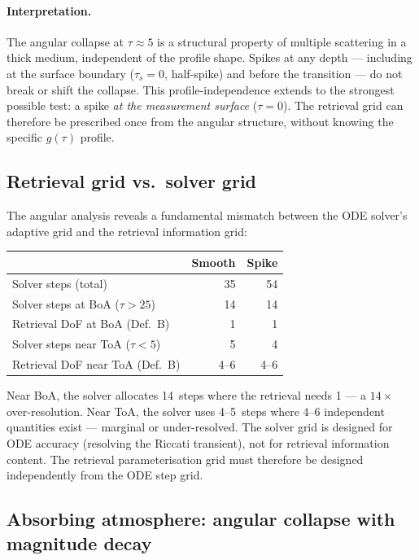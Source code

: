 \documentclass[11pt]{article}
\begin{document}
\paragraph{Interpretation.}
The angular collapse at $\tau\approx 5$ is a structural property
of multiple scattering in a thick medium, independent of the
profile shape.  Spikes at any depth --- including at the
surface boundary ($\tau_s=0$, half-spike) and before the
transition --- do not break or shift the collapse.
This profile-independence extends to the strongest possible
test: a spike \emph{at the measurement surface} ($\tau=0$).
The retrieval grid can therefore be prescribed once from the
angular structure, without knowing the specific $g(\tau)$ profile.

\subsection{Retrieval grid vs.\ solver grid}

The angular analysis reveals a fundamental mismatch between
the ODE solver's adaptive grid and the retrieval information
grid:

\begin{center}
\begin{tabular}{l r r}
\toprule
 & Smooth & Spike\\
\midrule
Solver steps (total)     & 35  & 54\\
Solver steps at BoA ($\tau>25$) & 14  & 14\\
Retrieval DoF at BoA (Def.\ B) & 1   & 1\\[3pt]
Solver steps near ToA ($\tau<5$) & 5   & 4\\
Retrieval DoF near ToA (Def.\ B) & 4--6 & 4--6\\
\bottomrule
\end{tabular}
\end{center}

Near BoA, the solver allocates 14~steps where the retrieval
needs 1 --- a $14\times$ over-resolution.  Near ToA, the solver
uses 4--5~steps where 4--6 independent quantities exist ---
marginal or under-resolved.  The solver grid is designed for ODE
accuracy (resolving the Riccati transient), not for retrieval
information content.  The retrieval parameterisation grid must
therefore be designed independently from the ODE step grid.


\subsection{Absorbing atmosphere: angular collapse with magnitude decay}
\end{document}
